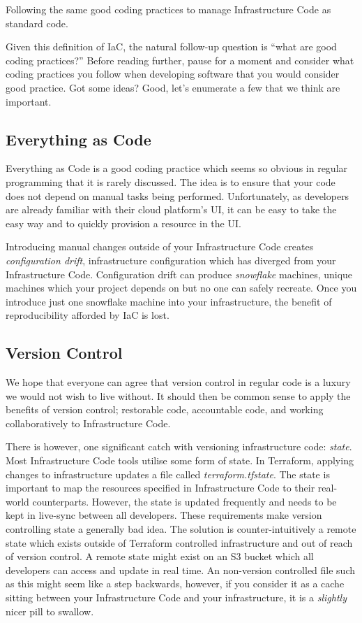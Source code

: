 \begin{definition}
Following the same good coding practices to manage Infrastructure Code as standard code.
\end{definition}

Given this definition of IaC,
the natural follow-up question is 
``what are good coding practices?''
Before reading further,
pause for a moment and consider what coding practices you follow when developing software that you would consider good practice.
Got some ideas? Good, let's enumerate a few that we think are important.

\subsection{Everything as Code}
Everything as Code is a good coding practice which seems so obvious in regular programming that it is rarely discussed.
The idea is to ensure that your code does not depend on manual tasks being performed.
Unfortunately, as developers are already familiar with their cloud platform's UI,
it can be easy to take the easy way and to quickly provision a resource in the UI.

Introducing manual changes outside of your Infrastructure Code creates \textsl{configuration drift}, infrastructure configuration which has diverged from your Infrastructure Code.
Configuration drift can produce \textsl{snowflake} machines,
unique machines which your project depends on but no one can safely recreate.
Once you introduce just one snowflake machine into your infrastructure,
the benefit of reproducibility afforded by IaC is lost.

\subsection{Version Control}
We hope that everyone can agree that version control in regular code is a luxury we would not wish to live without.
It should then be common sense to apply the benefits of version control;
restorable code, accountable code, and working collaboratively to Infrastructure Code.

There is however, one significant catch with versioning infrastructure code: \textit{state}.
Most Infrastructure Code tools utilise some form of state.
In Terraform, applying changes to infrastructure updates a file called \textit{terraform.tfstate}.
The state is important to map the resources specified in Infrastructure Code to their real-world counterparts.
However, the state is updated frequently and needs to be kept in live-sync between all developers.
These requirements make version controlling state a generally bad idea.
The solution is counter-intuitively a remote state which exists outside of Terraform controlled infrastructure and out of reach of version control.
A remote state might exist on an S3 bucket which all developers can access and update in real time.
An non-version controlled file such as this might seem like a step backwards, however,
if you consider it as a cache sitting between your Infrastructure Code and your infrastructure,
it is a \textit{slightly} nicer pill to swallow.

